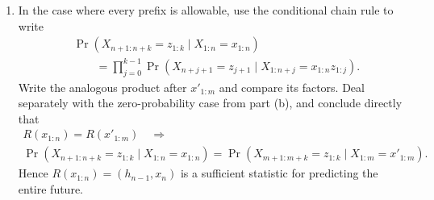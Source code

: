 \begin{exercise}
\begin{enumerate}
    \item In the case where every prefix is allowable, use the conditional
      chain rule to write
      \[
        \begin{aligned}
        &\Pr\!\left(
          X_{n+1:n+k}=z_{1:k}\mid X_{1:n}=x_{1:n}
        \right)\\
        &\qquad=
        \prod_{j=0}^{k-1}
        \Pr\!\left(
          X_{n+j+1}=z_{j+1}
          \mid X_{1:n+j}=x_{1:n}z_{1:j}
        \right).
        \end{aligned}
      \]
      Write the analogous product after $x'_{1:m}$ and compare its factors.
      Deal separately with the zero-probability case from part (b), and
      conclude directly that
      \[
        \begin{gathered}
          R(x_{1:n})=R(x'_{1:m})
          \quad\Longrightarrow\\[1mm]
          \Pr\!\left(
            X_{n+1:n+k}=z_{1:k}\mid X_{1:n}=x_{1:n}
          \right)
          =
          \Pr\!\left(
            X_{m+1:m+k}=z_{1:k}\mid X_{1:m}=x'_{1:m}
          \right).
        \end{gathered}
      \]
      Hence $R(x_{1:n})=(h_{n-1},x_n)$ is a sufficient statistic for
      predicting the entire future.
  \end{enumerate}
\end{exercise}
